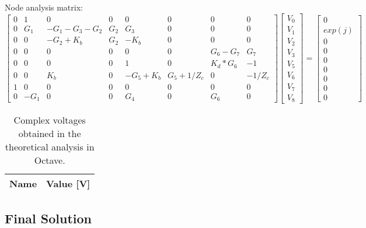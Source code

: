 Node analysis matrix:
\begin{equation}
\begin{bmatrix}
  0 & 1 & 0 & 0 & 0 & 0 & 0 & 0 \\
  0 & G_1 & -G_1-G_3-G_2 & G_2 & G_3 & 0 & 0 & 0\\
  0 & 0 & -G_2+K_b & G_2 & -K_b & 0 & 0 & 0 \\
  0 & 0 & 0 & 0 & 0 & 0 & G_6-G_7 & G_7 \\
  0 & 0 & 0 & 0 & 1 & 0 & K_d*G_6 & -1 \\
  0 & 0 & K_b & 0 & -G_5+K_b & G_5+1/Z_c & 0 & -1/Z_c \\
  1 & 0 & 0 & 0 & 0 & 0 & 0 & 0 \\
  0 & -G_1 & 0 & 0 & G_4 & 0 & G_6 & 0
\end{bmatrix}
\begin{bmatrix}
  V_0 \\ V_1 \\ V_2 \\ V_3 \\ V_5 \\ V_6 \\ V_7 \\ V_8 
\end{bmatrix}
=
\begin{bmatrix}
  0 \\ exp(j) \\ 0 \\ 0 \\ 0 \\ 0 \\ 0 \\ 0 \\ 0
\end{bmatrix}
\end{equation}

\begin{table}[H]
  \centering
  \begin{tabular}{|l|r|}
    \hline    
    {\bf Name} & {\bf Value [V]} \\ \hline
	
  \end{tabular}
  \caption{Complex voltages obtained in the theoretical analysis in Octave.}
  \label{tab:octave_4}
\end{table}

\subsection{Final Solution}

